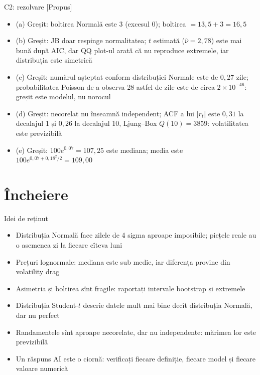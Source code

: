 \ifsolutions
\begin{frame}{C2: rezolvare [Propus]}
\itemsize{\footnotesize}
\begin{itemize}
    \item (a) Greșit: boltirea Normală este 3 (excesul 0); boltirea $= 13{,}5 + 3 = 16{,}5$
    \item (b) Greșit: JB doar respinge normalitatea; $t$ estimată ($\hat\nu = 2{,}78$) este mai bună după AIC, dar QQ plot-ul arată că nu reproduce extremele, iar distribuția este simetrică
    \item (c) Greșit: numărul așteptat conform distribuției Normale este de $0{,}27$ zile; probabilitatea Poisson de a observa 28 astfel de zile este de circa $2 \times 10^{-46}$: greșit este modelul, nu norocul
    \item (d) Greșit: necorelat nu înseamnă independent; ACF a lui $|r_t|$ este $0{,}31$ la decalajul 1 și $0{,}26$ la decalajul 10, Ljung--Box $Q(10) = 3859$: volatilitatea este previzibilă
    \item (e) Greșit: $100e^{0{,}07} = 107{,}25$ este mediana; media este $100e^{0{,}07 + 0{,}18^2/2} = 109{,}00$
\end{itemize}
\end{frame}
\fi


\section{Încheiere}

\begin{frame}{Idei de reținut}
\itemsize{\small}
\begin{itemize}
    \item Distribuția Normală face zilele de 4 sigma aproape imposibile; piețele reale au o asemenea zi la fiecare cîteva luni
    \item Prețuri lognormale: mediana este sub medie, iar diferența provine din volatility drag
    \item Asimetria și boltirea sînt fragile: raportați intervale bootstrap și extremele
    \item Distribuția Student-$t$ descrie datele mult mai bine decît distribuția Normală, dar nu perfect
    \item Randamentele sînt aproape necorelate, dar nu independente: mărimea lor este previzibilă
    \item Un răspuns AI este o ciornă: verificați fiecare definiție, fiecare model și fiecare valoare numerică
\end{itemize}
\end{frame}

